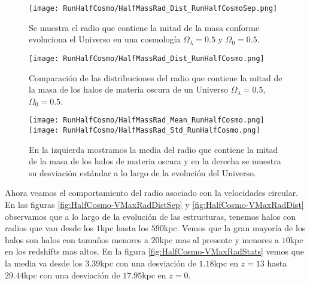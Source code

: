 \begin{figure}[H]
    \centering
    \texttt{[image: RunHalfCosmo/HalfMassRad\_Dist\_RunHalfCosmoSep.png]}
    \caption[Radio que contiene la mitad de la masa en la evolución de un Universo $\Omega_\lambda = 0.5 $, $\Omega_0 = 0.5$]{\footnotesize Se muestra el radio que contiene la mitad de la masa conforme evoluciona el Universo en una cosmología $\Omega_\lambda = 0.5 $ y $\Omega_0 = 0.5$.}
    \label{fig:HalfCosmo-HalfMassRadDistSep}
\end{figure}

\begin{figure}[H]
    \centering
    \texttt{[image: RunHalfCosmo/HalfMassRad\_Dist\_RunHalfCosmo.png]}
    \caption[Distribución del Radio que contiene la mitad de la masa de un Universo $\Omega_\lambda = 0.5 $, $\Omega_0 = 0.5$]{\footnotesize Comparación de las distribuciones del radio que contiene la mitad de la masa de los halos de materia oscura de un Universo $\Omega_\lambda = 0.5 $, $\Omega_0 = 0.5$.}
    \label{fig:HalfCosmo-HalfMassRadDist}
\end{figure}

\begin{figure}[H]
    \centering
    \texttt{[image: RunHalfCosmo/HalfMassRad\_Mean\_RunHalfCosmo.png]}
    \texttt{[image: RunHalfCosmo/HalfMassRad\_Std\_RunHalfCosmo.png]}
    \caption[Media y desviación estándar del radio de la mitad de la masa de un Universo $\Omega_\lambda = 0.5 $, $\Omega_0 = 0.5$]{\footnotesize En la izquierda mostramos la media del radio que contiene la mitad de la masa de los halos de materia oscura y en la derecha se muestra su desviación estándar a lo largo de la evolución del Universo.}
    \label{fig:HalfCosmo-HalfMassRadStats}
\end{figure}

Ahora veamos el comportamiento del radio asociado con la velocidades circular. En las figuras \ref{fig:HalfCosmo-VMaxRadDistSep} y \ref{fig:HalfCosmo-VMaxRadDist} observamos que a lo largo de la evolución de las estructuras, tenemos halos con radios que van desde los $1$kpc hasta los $590$kpc. Vemos que la gran mayoría de los halos son halos con tamaños menores a $20$kpc mas al presente y menores a $10$kpc en los redshifts mas altos. En la figura \ref{fig:HalfCosmo-VMaxRadStats} vemos que la media va desde los $3.39$kpc con una desviación de $1.18$kpc en $z=13$ hasta $29.44$kpc con una desviación de $17.95$kpc en $z=0$.


